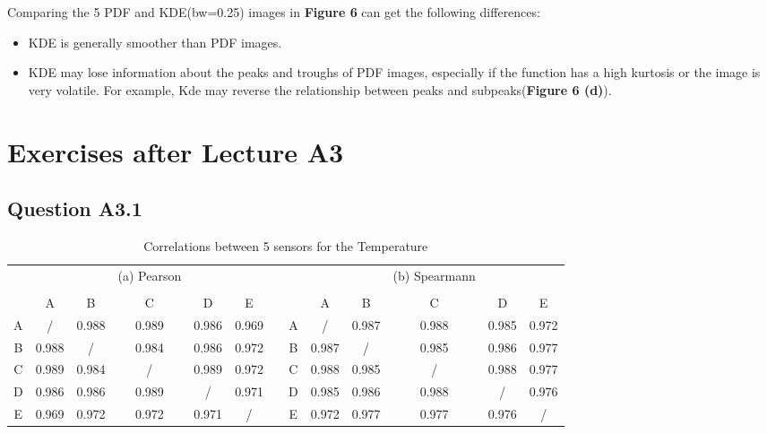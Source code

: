 \documentclass[a4paper]{article}
\begin{document}
\noindent Comparing the 5 PDF and KDE(bw=0.25) images in \textbf{Figure 6} can get the following differences:
\begin{itemize}
    \item KDE is generally smoother than PDF images.
    \item KDE may lose information about the peaks and troughs of PDF images, especially if the function has a high kurtosis or the image is very volatile. For example, Kde may reverse the relationship between peaks and subpeaks(\textbf{Figure 6 (d)}).
\end{itemize}

\section{Exercises after Lecture A3}
\subsection{Question A3.1}

\begin{table}[htbp]
  \centering
  \caption{Correlations between 5 sensors for the Temperature}
    \begin{tabular}{c|ccccccc|ccccc}
    \multicolumn{1}{c}{} &       &       & (a) Pearson &       &       &       & \multicolumn{1}{c}{} &       &       & (b) Spearmann &       &  \\
    \multicolumn{1}{c}{} &       &       &       &       &       &       & \multicolumn{1}{c}{} &       &       &       &       &  \\
          & A     & B     & C     & D     & E     &       &       & A     & B     & C     & D     & E \\
\cmidrule{1-6}\cmidrule{8-13}    A     & /     & 0.988  & 0.989  & 0.986  & 0.969  &       & A     & /     & 0.987  & 0.988  & 0.985  & 0.972  \\
    B     & 0.988  & /     & 0.984  & 0.986  & 0.972  &       & B     & 0.987  & /     & 0.985  & 0.986  & 0.977  \\
    C     & 0.989  & 0.984  & /     & 0.989  & 0.972  &       & C     & 0.988  & 0.985  & /     & 0.988  & 0.977  \\
    D     & 0.986  & 0.986  & 0.989  & /     & 0.971  &       & D     & 0.985  & 0.986  & 0.988  & /     & 0.976  \\
    E     & 0.969  & 0.972  & 0.972  & 0.971  & /     &       & E     & 0.972  & 0.977  & 0.977  & 0.976  & / \\
    \end{tabular}%
\end{table}%
\end{document}
